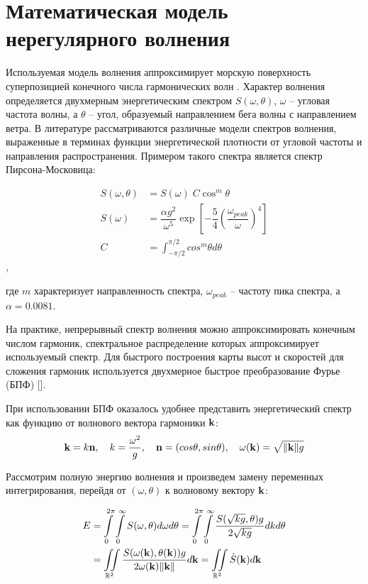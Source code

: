 \section{Математическая модель нерегулярного волнения}

Используемая модель волнения аппроксимирует морскую поверхность суперпозицией конечного числа гармонических волн \cite{lopatuhin2004}. Характер волнения определяется двухмерным энергетическим спектром $S(\omega, \theta)$, $\omega$ -- угловая частота волны, а $\theta$ -- угол, образуемый направлением бега волны с направлением ветра. В литературе \cite{lopatuhin2004} рассматриваются различные модели спектров волнения, выраженные в терминах функции энергетической плотности от угловой частоты и направления распространения. Примером такого спектра является спектр Пирсона-Московица:

\begin{equation}
	\begin{split}
	S(\omega, \theta) &= S(\omega) \; C \cos^m\theta \\
	S(\omega) &= \dfrac{\alpha g^2}{\omega^5} \exp \left[ 
	  -\dfrac{5}{4} \left( \dfrac{\omega_{peak}}{\omega} \right)^{4} 
	\right]  \\
	C &= \int_{-\pi/2}^{\pi/2} cos^m\theta d\theta
	\end{split}
\end{equation}, 

где $m$ характеризует направленность спектра, $\omega_{peak}$ -- частоту пика спектра, а $\alpha = 0.0081$.

На практике, непрерывный спектр волнения можно аппроксимировать конечным числом гармоник, спектральное распределение которых аппроксимирует используемый спектр. Для быстрого построения карты высот и скоростей для сложения гармоник используется двухмерное быстрое преобразование Фурье (БПФ) [].
 
При использовании БПФ оказалось удобнее представить энергетический спектр как функцию от волнового вектора гармоники $\mathbf{k}$:
$$ \mathbf{k} = k\mathbf{n},\quad 
k = \frac{\omega^2}{g} ,\quad 
\mathbf{n}=(cos \theta, sin \theta), \quad 
\omega(\mathbf{k}) = \sqrt{\lVert \mathbf{k} \rVert g} $$

Рассмотрим полную энергию волнения и произведем замену переменных интегрирования, перейдя от $(\omega, \theta)$ к волновому вектору $\mathbf{k}$:

\begin{equation}
	\begin{split}
	E &= \int\limits_0^{2\pi}
		 \int\limits_0^\infty S(\omega, \theta) d\omega d\theta
	  = \int\limits_0^{2\pi}
		 \int\limits_0^\infty 
			 \frac {S(\sqrt{kg}, \theta)g} {2\sqrt{kg}} dk d\theta\\
	  &= \iint\limits_{\mathbb{R}^2}
			 \frac{S(\omega(\mathbf{k}), \theta(\mathbf{k})) g}
				  {2\omega(\mathbf{k}) \lVert \mathbf{k} \rVert} d\mathbf{k}
	  = \iint\limits_{\mathbb{R}^2} \hat{S}(\mathbf{k})d\mathbf{k}
	\end{split}
\end{equation}

